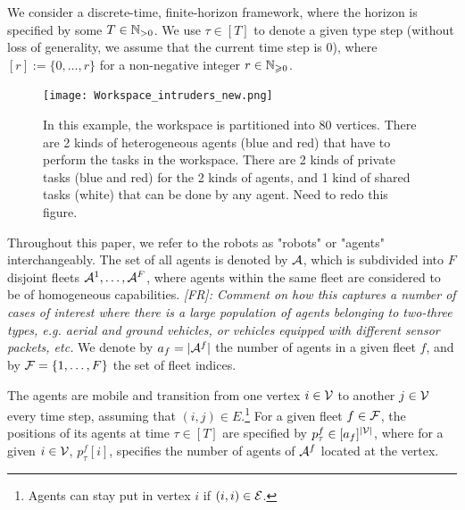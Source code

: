\documentclass[conference]{IEEEtran}
\newcommand{\frline}[2]{{\color{blue}#1}{\em \color{blue}[FR]: #2}}
\newcommand{\todo}[1]{{\color{red}{\bf TODO:} #1}}
\newcommand{\frline}[2]{#1}
\newcommand{\todo}[1]{}
\begin{document}
We consider a discrete-time, finite-horizon framework, where the horizon is specified by some $T\in \mathbb{N}_{>0}$. We use $\tau\in [T]$ to denote a given type step (without loss of generality, we assume that the current time step is $0$), where $[r]:=\{0,\ldots,r\}$ for a non-negative integer $r\in \mathbb{N}_{\geqslant 0}$.


\begin{figure}[!ht]
    \centering
    \texttt{[image: Workspace\_intruders\_new.png]}
    \caption{In this example, the workspace is partitioned into $80$ vertices. There are 2 kinds of heterogeneous agents (blue and red) that have to perform the tasks in the workspace. There are 2 kinds of private tasks (blue and red) for the 2 kinds of agents, and 1 kind of shared tasks (white) that can be done by any agent. \todo{Need to redo this figure.}}
    \label{fig:workspace}
\end{figure}

Throughout this paper, we refer to the robots as "robots" or "agents" interchangeably. The set of all agents is denoted by $\mathcal{A}$, which is subdivided into $F$ disjoint fleets $\mathcal{A}^1,\ldots, \mathcal{A}^F$, where agents within the same fleet are considered to be of homogeneous capabilities.
\frline{}{Comment on how this captures a number of cases of interest where there is a large population of agents belonging to two-three types, e.g. aerial and ground vehicles, or vehicles equipped with different sensor packets, etc.}
We denote by $a_f=|\mathcal{A}^f|$ the number of agents in a given fleet $f$, and by $\mathcal{F}=\{1,\ldots,F\}$ the set of fleet indices. 

The agents are mobile and transition from one vertex $i\in \mathcal{V}$ to another $j\in \mathcal{V}$ every time step, assuming that $(i,j)\in E$.\footnote{Agents can stay put in vertex $i$ if $(i,i)\in \mathcal{E}$.}
For a given fleet $f\in \mathcal{F}$, the positions of its agents at time $\tau\in [T]$ are specified by $p^f_\tau\in [a_f]^{ |\mathcal{V}|}$, where for a given $i\in \mathcal{V}$, $p^f_\tau[i]$, specifies the number of agents of $\mathcal{A}^f$ located at the vertex. %
\end{document}
